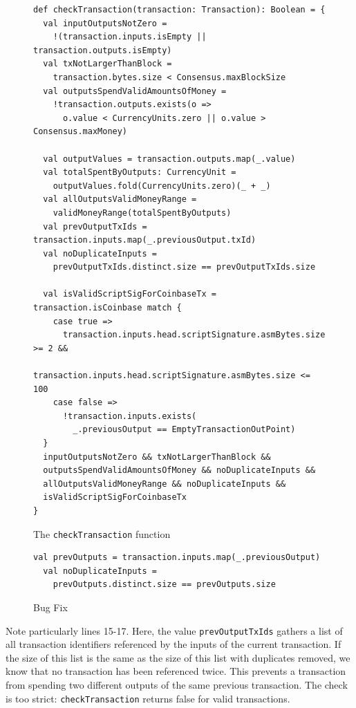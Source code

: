 \documentclass[hyphens, a4paper,USenglish,cleveref, autoref, thm-restate]{oasics-v2019}
\begin{document}
\begin{figure}
\begin{lstlisting}[style=scala]
def checkTransaction(transaction: Transaction): Boolean = {
  val inputOutputsNotZero =
    !(transaction.inputs.isEmpty || transaction.outputs.isEmpty)
  val txNotLargerThanBlock = 
    transaction.bytes.size < Consensus.maxBlockSize
  val outputsSpendValidAmountsOfMoney = 
    !transaction.outputs.exists(o =>
      o.value < CurrencyUnits.zero || o.value > Consensus.maxMoney)

  val outputValues = transaction.outputs.map(_.value)
  val totalSpentByOutputs: CurrencyUnit =
    outputValues.fold(CurrencyUnits.zero)(_ + _)
  val allOutputsValidMoneyRange = 
    validMoneyRange(totalSpentByOutputs)
  val prevOutputTxIds = transaction.inputs.map(_.previousOutput.txId)
  val noDuplicateInputs = 
    prevOutputTxIds.distinct.size == prevOutputTxIds.size

  val isValidScriptSigForCoinbaseTx = transaction.isCoinbase match {
    case true =>
      transaction.inputs.head.scriptSignature.asmBytes.size >= 2 &&
        transaction.inputs.head.scriptSignature.asmBytes.size <= 100
    case false =>
      !transaction.inputs.exists(
        _.previousOutput == EmptyTransactionOutPoint)
  }
  inputOutputsNotZero && txNotLargerThanBlock && 
  outputsSpendValidAmountsOfMoney && noDuplicateInputs &&
  allOutputsValidMoneyRange && noDuplicateInputs && 
  isValidScriptSigForCoinbaseTx
}
\end{lstlisting}
  
  \caption{The \texttt{checkTransaction} function}
  \label{fig:checktrans}
\end{figure}

\begin{figure}
\begin{lstlisting}[style=scala, firstnumber=15]
  val prevOutputs = transaction.inputs.map(_.previousOutput)
  val noDuplicateInputs = 
    prevOutputs.distinct.size == prevOutputs.size
\end{lstlisting}
  \caption{Bug Fix}
  \label{fig:bugfix1}
\end{figure}


Note particularly lines 15-17.  Here, the value
\texttt{prevOutputTxIds} gathers a list of all transaction identifiers
referenced by the inputs of the current transaction. If the size of
this list is the same as the size of this list with duplicates
removed, we know that no transaction has been referenced twice. This
prevents a transaction from spending two different outputs of the same
previous transaction. The check is too strict:
\texttt{checkTransaction} returns false for valid transactions.
\end{document}
